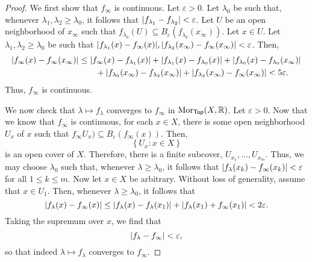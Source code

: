 \begin{thm}
\begin{proof}
We first show that $f_\infty$ is continuous.  Let $\varepsilon >0$.  Let $\lambda _0$ be such that, whenever $\lambda _1,\lambda _2\geq \lambda _0$, it follows that $\norm[f_{\lambda _1}-f_{\lambda _2}]<\varepsilon$.  Let $U$ be an open neighborhood of $x_\infty$ such that $f_{\lambda _0}(U)\subseteq B_{\varepsilon}(f_{\lambda _0}(x_\infty ))$.  Let $x\in U$.  Let $\lambda _1,\lambda _2\geq \lambda _0$ be such that $\lvert f_{\lambda _1}(x)-f_\infty (x)\rvert,\lvert f_{\lambda _2}(x_\infty )-f_\infty (x_\infty )\rvert<\varepsilon$.  Then,
\begin{equation}
\begin{split}
\lvert f_\infty (x)-f_\infty (x_\infty )\rvert & \leq \lvert f_\infty (x)-f_{\lambda _1}(x)\rvert+\lvert f_{\lambda _1}(x)-f_{\lambda _0}(x)\rvert+\lvert f_{\lambda _0}(x)-f_{\lambda _0}(x_\infty )\rvert \\
& \qquad +\lvert f_{\lambda _0}(x_\infty )-f_{\lambda _2}(x_\infty )\rvert+\lvert f_{\lambda _2}(x_\infty )-f_\infty (x_\infty )\rvert<5\varepsilon .
\end{split}
\end{equation}
Thus, $f_\infty$ is continuous.

We now check that $\lambda \mapsto f_\lambda$ converges to $f_\infty$ in $\operatorname{Mor} _{\mathsf{Top}}(X,\mathbb{R} )$.  Let $\varepsilon >0$.  Now that we know that $f_\infty$ is continuous, for each $x\in X$, there is some open neighborhood $U_x$ of $x$ such that $f_\infty U_x)\subseteq B_{\varepsilon}(f_\infty (x))$.  Then, 
\begin{equation}
\left\{ U_x:x\in X\right\} 
\end{equation}
is an open cover of $X$.  Therefore, there is a finite subcover, $U_{x_1},\ldots ,U_{x_m}$.  Thus, we may choose $\lambda _0$ such that, whenever $\lambda \geq \lambda _0$, it follows that $\lvert f_\lambda (x_k)-f_\infty (x_k)\rvert<\varepsilon$ for all $1\leq k\leq m$.  Now let $x\in X$ be arbitrary.  Without loss of generality, assume that $x\in U_1$.  Then, whenever $\lambda \geq \lambda _0$, it follows that
\begin{equation}
\lvert f_\lambda (x)-f_\infty (x)\rvert\leq \lvert f_\lambda (x)-f_\lambda (x_1)\rvert+\lvert f_\lambda (x_1)+f_\infty (x_1)\rvert<2\varepsilon .
\end{equation}
Taking the supremum over $x$, we find that
\begin{equation}
\norm[f_\lambda -f_\infty ]<\varepsilon ,
\end{equation}
so that indeed $\lambda \mapsto f_\lambda$ converges to $f_\infty$.


\end{proof}
\end{thm}

